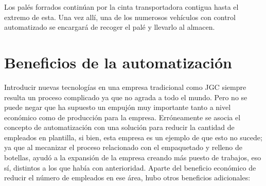 \documentclass[11pt,a4paper,spanish,twoside]{report}
\begin{document}
Los palés forrados continúan por la cinta transportadora contigua hasta el 
extremo de esta. Una vez allí, una de los numerosos vehículos con control 
automatizado se encargará de recoger el palé y llevarlo al almacen.

\chapter{Beneficios de la automatización}
Introducir nuevas tecnologías en una empresa tradicional como JGC siempre
resulta un proceso complicado ya que no agrada a todo el mundo. Pero no se
puede negar que ha supuesto un empujón muy importante tanto a nivel económico 
como de producción para la empresa. Erróneamente se asocia el concepto de
automatización con una solución para reducir la cantidad de empleados en
plantilla, si bien, esta empresa es un ejemplo de que esto no sucede; ya que al
mecanizar el proceso relacionado con el empaquetado y relleno de botellas,
ayudó a la expansión de la empresa creando más puesto de trabajos, eso sí,
distintos a los que había con anterioridad. Aparte del beneficio económico de
reducir el número de empleados en ese área, hubo otros beneficios adicionales:
\end{document}
